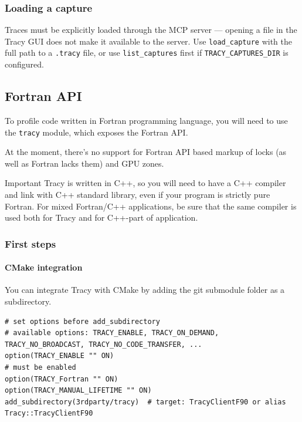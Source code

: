 \documentclass[hidelinks,titlepage,a4paper,twoside]{article}
\begin{document}
\subsubsection{Loading a capture}

Traces must be explicitly loaded through the MCP server — opening a file in the Tracy GUI does not make it available to the server. Use \texttt{load\_capture} with the full path to a \texttt{.tracy} file, or use \texttt{list\_captures} first if \texttt{TRACY\_CAPTURES\_DIR} is configured.

\subsection{Fortran API}
\label{fortranapi}

To profile code written in Fortran programming language, you will need to use the \texttt{tracy} module, which exposes the Fortran API.

At the moment, there's no support for Fortran API based markup of locks (as well as Fortran lacks them) and GPU zones.

\begin{bclogo}[
noborder=true,
couleur=black!5,
logo=\bcbombe
]{Important}
Tracy is written in C++, so you will need to have a C++ compiler and link with C++ standard library, even if your program is strictly pure Fortran.
For mixed Fortran/C++ applications, be sure that the same compiler is used both for Tracy and for C++-part of application.
\end{bclogo}

\subsubsection{First steps}

\paragraph{CMake integration}

You can integrate Tracy with CMake by adding the git submodule folder as a subdirectory.

\begin{lstlisting}
# set options before add_subdirectory
# available options: TRACY_ENABLE, TRACY_ON_DEMAND, TRACY_NO_BROADCAST, TRACY_NO_CODE_TRANSFER, ...
option(TRACY_ENABLE "" ON)
# must be enabled
option(TRACY_Fortran "" ON)
option(TRACY_MANUAL_LIFETIME "" ON)
add_subdirectory(3rdparty/tracy)  # target: TracyClientF90 or alias Tracy::TracyClientF90
\end{lstlisting}
\end{document}
